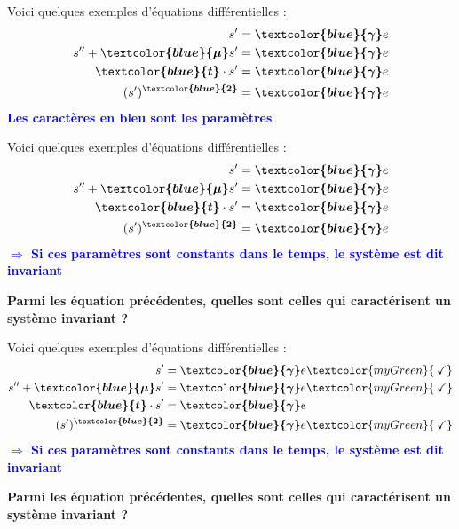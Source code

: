 \documentclass[a4paper,11pt]{beamer}
\begin{document}
\begin{frame}
\justifying
Voici quelques exemples d'équations différentielles :
\begin{align}
  s' &= \bm{\textcolor{blue}{\gamma}} e\\
  s''+ \bm{\textcolor{blue}{\mu}} s' &= \bm{\textcolor{blue}{\gamma}}
  e\\
  \bm{\textcolor{blue}{t}} \cdot s' &= \bm{\textcolor{blue}{\gamma}} e\\
  (s')^{\bm{\textcolor{blue}{2}}} &= \bm{\textcolor{blue}{\gamma}} e
\end{align}
\centering
\textcolor{blue}{\textbf{Les caractères en bleu sont les paramètres}}
\end{frame}

\begin{frame}
\justifying
Voici quelques exemples d'équations différentielles :
\setcounter{equation}{0}
\begin{align}
  s' &= \bm{\textcolor{blue}{\gamma}} e\\
  s''+ \bm{\textcolor{blue}{\mu}} s' &= \bm{\textcolor{blue}{\gamma}}
  e\\
  \bm{\textcolor{blue}{t}} \cdot s' &= \bm{\textcolor{blue}{\gamma}} e\\
  (s')^{\bm{\textcolor{blue}{2}}} &= \bm{\textcolor{blue}{\gamma}} e
\end{align}
\centering
\textcolor{blue}{\textbf{$\Rightarrow$ Si ces paramètres sont constants dans le
temps, le système est dit invariant}}
\vspace{1cm}

\pause
\textcolor{myGreen}{\textbf{Parmi les équation précédentes, quelles sont celles
qui caractérisent un système invariant ?}}
\end{frame}

\begin{frame}
\justifying
Voici quelques exemples d'équations différentielles :
\setcounter{equation}{0}
\begin{align}
  s' &= \bm{\textcolor{blue}{\gamma}} e \textcolor{myGreen}{\:\checkmark}\\
  s''+ \bm{\textcolor{blue}{\mu}} s' &= \bm{\textcolor{blue}{\gamma}}
  e \textcolor{myGreen}{\:\checkmark}\\
  \bm{\textcolor{blue}{t}} \cdot s' &= \bm{\textcolor{blue}{\gamma}} e\\
  (s')^{\bm{\textcolor{blue}{2}}} &= \bm{\textcolor{blue}{\gamma}} e \textcolor{myGreen}{\:\checkmark}
\end{align}
\centering
\textcolor{blue}{\textbf{$\Rightarrow$ Si ces paramètres sont constants dans le
temps, le système est dit invariant}}
\vspace{1cm}

\textcolor{myGreen}{\textbf{Parmi les équation précédentes, quelles sont celles
qui caractérisent un système invariant ?}}
\end{frame}
\end{document}
